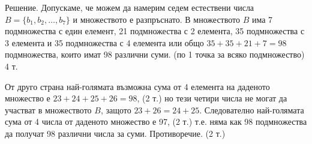 Решение. Допускаме, че можем да намерим седем естествени числа $B=\{b_1,b_2,\ldots,b_7\}$ и множеството е разпръснато. В множеството $B$ има 7 подмножества с един елемент, 21 подмножества с 2 елемента, 35 подмножества с 3 елемента и 35 подмножества с 4 елемента или общо $35+35+21+7=98$ подмножества, които имат 98 различни суми. (по 1 точка за всяко подмножество) \hfill 4 т.

От друго страна най-голямата възможна сума от 4 елемента на даденото множество е $23+24+25+26=98$, (2 т.) но тези четири числа не могат да участват в множеството $B$, защото $23+26=24+25$. Следователно най-голямата сума от 4 числа от даденото множество е 97, (2 т.) т.е. няма как 98 подмножества да получат 98 различни числа за суми. Противоречие. (2 т.)
